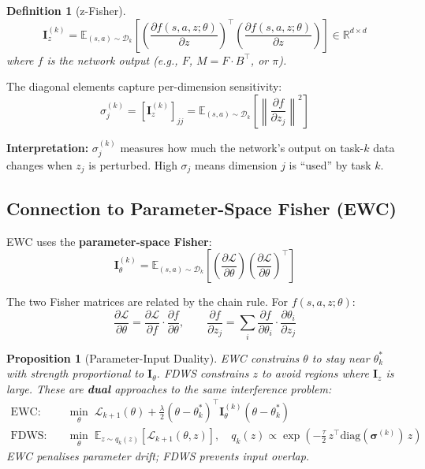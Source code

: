 \documentclass[11pt]{article}
\newcommand{\E}{\mathbb{E}}
\newcommand{\R}{\mathbb{R}}
\newcommand{\loss}{\mathcal{L}}
\newcommand{\D}{\mathcal{D}}
\newcommand{\diag}{\mathrm{diag}}
\newtheorem{definition}{Definition}
\newtheorem{proposition}{Proposition}
\begin{document}
\begin{definition}[z-Fisher]
\begin{equation}\label{eq:z-fisher}
    \bm{I}_z^{(k)} = \E_{(s,a) \sim \D_k} \left[ \left(\frac{\partial f(s, a, z; \theta)}{\partial z}\right)^\top \left(\frac{\partial f(s, a, z; \theta)}{\partial z}\right) \right] \in \R^{d \times d}
\end{equation}
where $f$ is the network output (e.g., $F$, $M = F \cdot B^\top$, or $\pi$).
\end{definition}

The diagonal elements capture per-dimension sensitivity:
\begin{equation}
    \sigma_j^{(k)} = \left[\bm{I}_z^{(k)}\right]_{jj} = \E_{(s,a) \sim \D_k} \left[ \left\| \frac{\partial f}{\partial z_j} \right\|^2 \right]
\end{equation}

\textbf{Interpretation:} $\sigma_j^{(k)}$ measures how much the network's output on task-$k$ data changes when $z_j$ is perturbed. High $\sigma_j$ means dimension $j$ is ``used'' by task $k$.

\subsection{Connection to Parameter-Space Fisher (EWC)}

EWC uses the \textbf{parameter-space Fisher}:
\begin{equation}
    \bm{I}_\theta^{(k)} = \E_{(s,a) \sim \D_k} \left[ \left(\frac{\partial \loss}{\partial \theta}\right)\left(\frac{\partial \loss}{\partial \theta}\right)^\top \right]
\end{equation}

The two Fisher matrices are related by the chain rule. For $f(s, a, z; \theta)$:
\begin{equation}
    \frac{\partial \loss}{\partial \theta} = \frac{\partial \loss}{\partial f} \cdot \frac{\partial f}{\partial \theta}, \qquad
    \frac{\partial f}{\partial z_j} = \sum_i \frac{\partial f}{\partial \theta_i} \cdot \frac{\partial \theta_i}{\partial z_j}
\end{equation}

\begin{proposition}[Parameter-Input Duality]
EWC constrains $\theta$ to stay near $\theta^*_k$ with strength proportional to $\bm{I}_\theta$. FDWS constrains $z$ to avoid regions where $\bm{I}_z$ is large. These are \textbf{dual} approaches to the same interference problem:
\begin{align}
    \text{EWC:} \quad & \min_\theta \; \loss_{k+1}(\theta) + \frac{\lambda}{2} (\theta - \theta^*_k)^\top \bm{I}_\theta^{(k)} (\theta - \theta^*_k) \label{eq:ewc}\\
    \text{FDWS:} \quad & \min_\theta \; \E_{z \sim q_k(z)} \left[ \loss_{k+1}(\theta, z) \right], \quad q_k(z) \propto \exp\!\left(-\tfrac{\tau}{2}\, z^\top \diag(\bm{\sigma}^{(k)})\, z\right) \label{eq:fdws}
\end{align}
EWC penalises parameter \emph{drift}; FDWS prevents input \emph{overlap}.
\end{proposition}
\end{document}
